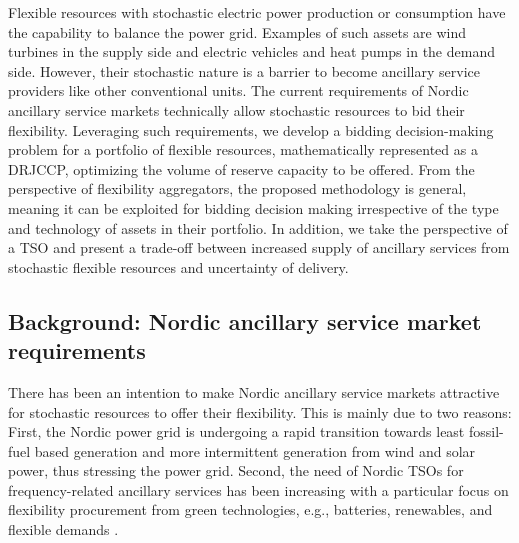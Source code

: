\documentclass[conference]{IEEEtran}
\begin{document}
Flexible resources with stochastic electric power production or consumption have the capability to balance the power grid. Examples of such assets are  wind turbines in the supply side and electric vehicles and heat pumps in the demand side. However, their stochastic nature is a barrier to become ancillary service providers like other conventional units. The current requirements of Nordic ancillary service markets  technically allow stochastic resources to bid their flexibility. Leveraging such requirements, we develop a bidding decision-making problem for a portfolio of flexible resources, mathematically represented as a  \ac{DRJCCP}, optimizing the volume of reserve capacity to be offered. From the  perspective of flexibility aggregators, the proposed methodology is general, meaning it can be exploited for bidding decision making irrespective of the type and technology of  assets in their portfolio. %
In addition, we take the perspective of a \ac{TSO} and present a trade-off between increased  supply of ancillary services from stochastic flexible resources and uncertainty of delivery. 


\vspace{2mm}
\subsection{Background: Nordic ancillary service market requirements}\label{sec:background}
\vspace{-1mm}
There has been an intention to make Nordic ancillary service markets attractive for stochastic resources to offer their flexibility. This is mainly due to two reasons: First, the Nordic power grid is undergoing a rapid transition towards least fossil-fuel based generation and more intermittent generation from wind and solar power, thus stressing the power grid. Second, the need of Nordic \acp{TSO} for frequency-related ancillary services has been increasing with a particular focus on flexibility procurement from green technologies, e.g., batteries, renewables, and flexible demands \cite{energinet2}. 
\end{document}
